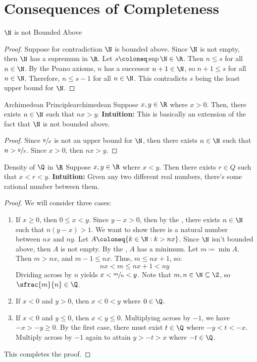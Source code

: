 \chapter{Consequences of Completeness}
\begin{thmbox}{$\N$ is not Bounded Above}{}
    \begin{proof}
        Suppose for contradiction $\N$ is bounded above. Since $\N$ is not empty, then $\N$ has a supremum in $\R$. Let $s \coloneq \sup \N \in \R$. Then $n \leq s$ for all $n \in \N$. By the Peano axioms, $n$ has a successor $n+1 \in \N$, so $n+1 \leq s$ for all $n \in \N$. Therefore, $n \leq s - 1$ for all $n \in \N$. This contradicts $s$ being the least upper bound for $\N$.
    \end{proof}
\end{thmbox}

\begin{thmbox}{Archimedean Principle}{archimedean}
    Suppose $x,y \in \R$ where $x > 0$. Then, there exists $n \in \N$ such that $nx > y$.
    \tcblower
    \textbf{Intuition:} This is basically an extension of the fact that $\N$ is not bounded above.
    \begin{proof}
        Since $\sfrac{y}{x}$ is not an upper bound for $\N$, then there exists $n \in \N$ such that $n > \sfrac{y}{x}$. Since $x > 0$, then $nx > y$.
    \end{proof}
\end{thmbox}

\begin{thmbox}{Density of $\Q$ in $\R$}{}
    Suppose $x,y \in \R$ where $x < y$. Then there exists $r \in Q$ such that $x < r < y$.
    \tcblower
    \textbf{Intuition:} Given any two different real numbers, there's some rational number between them.
    \begin{proof}
        We will consider three cases:
        \begin{enumerate}
            \item If $x \geq 0$, then $0 \leq x < y$. Since $y - x > 0$, then by the , there exists $n \in \N$ such that $n(y-x) > 1$. We want to show there is a natural number between $nx$ and $ny$. Let $A \coloneq \{ k \in \N : k > nx \}$. Since $\N$ isn't bounded above, then $A$ is not empty. By the , $A$ has a minimum. Let $m \coloneq \min A$. Then $m > nx$, and $m-1 \leq nx$. Thus, $m \leq nx+1$, so:
            \[ nx < m \leq nx+1 < ny \]
            Dividing across by $n$ yields $x < \sfrac{m}{n} < y$. Note that $m,n \in \N \subseteq \Z$, so $\sfrac{m}{n} \in \Q$.
            \item If $x < 0$ and $y > 0$, then $x < 0 < y$ where $0 \in \Q$.
            \item If $x < 0$ and $y \leq 0$, then $x < y \leq 0$. Multiplying across by $-1$, we have $-x > -y \geq 0$. By the first case, there must exist $t \in \Q$ where $-y < t < -x$. Multiply across by $-1$ again to attain $y > -t > x$ where $-t \in \Q$.
        \end{enumerate}
        This completes the proof.
    \end{proof}
\end{thmbox}

